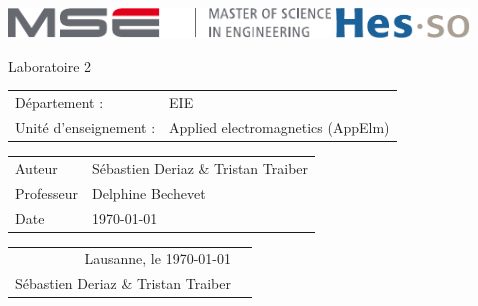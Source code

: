 \documentclass[]{report}
\newcommand{\Author}{Sébastien Deriaz \& Tristan Traiber}
\newcommand{\professor}{Delphine Bechevet}
\newcommand{\assistant}{}
\newcommand{\cours}{Applied electromagnetics (AppElm)}
\newcommand{\titre}{Laboratoire 2}
\begin{document}
\thispagestyle{empty}

\begin{center}
\includegraphics[height=8mm]{mse-full-cropped.pdf}
\hfill
\includegraphics[height=8mm]{HES-SO_logo_Pantone.pdf}
\end{center}
\vfill
\begin{center}
\Huge \titre\\
\end{center}
\begin{center}
\large
\begin{tabular}{ll}
Département : & EIE\\
Unité d'enseignement : & \cours
\end{tabular}
\end{center}
\vfill
\begin{center}
\large
\begin{tabular}{ll}
\Large Auteur & \Large \Author\\
Professeur & \professor\\ 
Date & \today
\end{tabular}
\end{center}
\vfill

\pagebreak
\tableofcontents
\pagebreak

\pagebreak

\pagebreak


\begin{flushright}
\begin{tabular}{r m{3cm}}
Lausanne, le \today & \\
\Author & \\
\end{tabular}
\end{flushright}

\pagebreak
\end{document}
